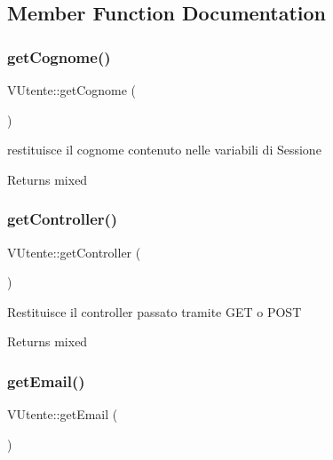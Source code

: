 \subsection{Member Function Documentation}
\mbox{\label{class_v_utente_a761813210ec7a6d4fc8255f47dc2c6fd}} 
\subsubsection{\texorpdfstring{get\+Cognome()}{getCognome()}}
{\footnotesize\ttfamily V\+Utente\+::get\+Cognome (\begin{DoxyParamCaption}{ }\end{DoxyParamCaption})}

restituisce il cognome contenuto nelle variabili di Sessione

\begin{DoxyReturn}{Returns}
mixed 
\end{DoxyReturn}
\mbox{\label{class_v_utente_a7c31b84c15e80c9150c15d60c1807a20}} 
\subsubsection{\texorpdfstring{get\+Controller()}{getController()}}
{\footnotesize\ttfamily V\+Utente\+::get\+Controller (\begin{DoxyParamCaption}{ }\end{DoxyParamCaption})}

Restituisce il controller passato tramite G\+ET o P\+O\+ST

\begin{DoxyReturn}{Returns}
mixed 
\end{DoxyReturn}
\mbox{\label{class_v_utente_a8e8e53d000b24756a28571714930f40b}} 
\subsubsection{\texorpdfstring{get\+Email()}{getEmail()}}
{\footnotesize\ttfamily V\+Utente\+::get\+Email (\begin{DoxyParamCaption}{ }\end{DoxyParamCaption})}

